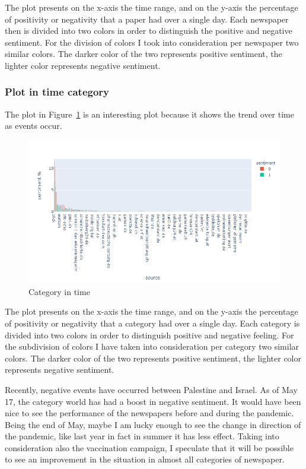 The plot presents on the x-axis the time range, and on the y-axis the percentage of positivity or negativity that a paper had over a single day.
Each newspaper then is divided into two colors in order to distinguish the positive and negative sentiment. For the division of colors I took into consideration per newspaper two similar colors. The darker color of the two represents positive sentiment, the lighter color represents negative sentiment.

\subsubsection{Plot in time category}
The plot in Figure~\ref{fig:fig_cattime} is an interesting plot because it shows the trend over time as events occur.

\begin{figure}[H]
\centering
\includegraphics[width=1\textwidth]{images/output_71_0.png}
\caption{Category in time}
\label{fig:fig_cattime}
\end{figure}
\FloatBarrier

The plot presents on the x-axis the time range, and on the y-axis the percentage of positivity or negativity that a category had over a single day.
Each category is divided into two colors in order to distinguish positive and negative feeling. For the subdivision of colors I have taken into consideration per category two similar colors. The darker color of the two represents positive sentiment, the lighter color represents negative sentiment.

Recently, negative events have occurred between Palestine and Israel. As of May 17, the category world has had a boost in negative sentiment. It would have been nice to see the performance of the newspapers before and during the pandemic. 
Being the end of May, maybe I am lucky enough to see the change in direction of the pandemic, like last year in fact in summer it has less effect. Taking into consideration also the vaccination campaign, I speculate that it will be possible to see an improvement in the situation in almost all categories of newspaper. 

